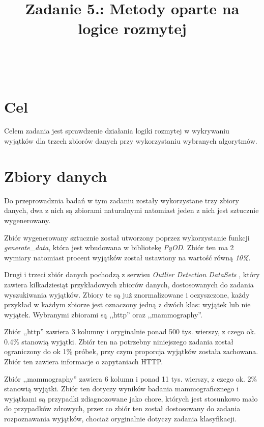\documentclass{classrep}
\author{%
    \studentinfo[239671@edu.p.lodz.pl]{Jan Karwowski}{239671}\\
    \studentinfo[239676@edu.p.lodz.pl]{Kamil Kowalewski}{239676}\\
}
\title{Zadanie 5.: Metody oparte na logice rozmytej}
\begin{document}
    \maketitle
    \thispagestyle{fancyplain}

    \tableofcontents
    \newpage

    \section{Cel} {
        Celem zadania jest sprawdzenie działania logiki rozmytej w wykrywaniu wyjątków
        dla trzech zbiorów danych przy wykorzystaniu wybranych algorytmów.
    }

    \section{Zbiory danych} {
        Do przeprowadznia badań w tym zadaniu zostały wykorzystane trzy zbiory danych,
        dwa z nich są zbiorami naturalnymi natomiast jeden z nich jest sztucznie
        wygenerowany.

        Zbiór wygenerowany sztucznie został utworzony poprzez wykorzystanie funkcji
        \textit{generate\_data}, która jest wbudowana w bibliotekę
        \textit{PyOD}\cite{pyod}. Zbiór ten ma 2 wymiary natomiast procent wyjątków
        został ustawiony na wartość równą \textit{10\%}.

        Drugi i trzeci zbiór danych pochodzą z serwisu \emph{Outlier Detection DataSets}
        \cite{odds}, który zawiera kilkadziesiąt przykładowych zbiorów
        danych, dostosowanych do zadania wyszukiwania wyjątków. Zbiory te są już
        znormalizowane i oczyszczone, każdy przykład w każdym zbiorze jest oznaczony
        jedną z dwóch klas: wyjątek lub nie wyjątek. Wybranymi zbiorami są ,,http''
        oraz ,,mammography''.

        Zbiór ,,http'' zawiera 3 kolumny i oryginalnie ponad 500 tys. wierszy, z czego
        ok. 0.4\% stanowią wyjątki. Zbiór ten na potrzebny niniejszego zadania został
        ograniczony do ok 1\% próbek, przy czym proporcja wyjątków została zachowana.
        Zbiór ten zawiera informacje o zapytaniach HTTP.

        Zbiór ,,mammography'' zawiera 6 kolumn i ponad 11 tys. wierszy, z czego ok. 2\%
        stanowią wyjątki. Zbiór ten dotyczy wyników badania mammograficznego i
        wyjątkami są przypadki zdiagnozowane jako chore, których jest stosunkowo mało
        do przypadków zdrowych, przez co zbiór ten został dostosowany do zadania
        rozpoznawania wyjątków, chociaż oryginalnie dotyczy zadania klasyfikacji.
    }
\end{document}
